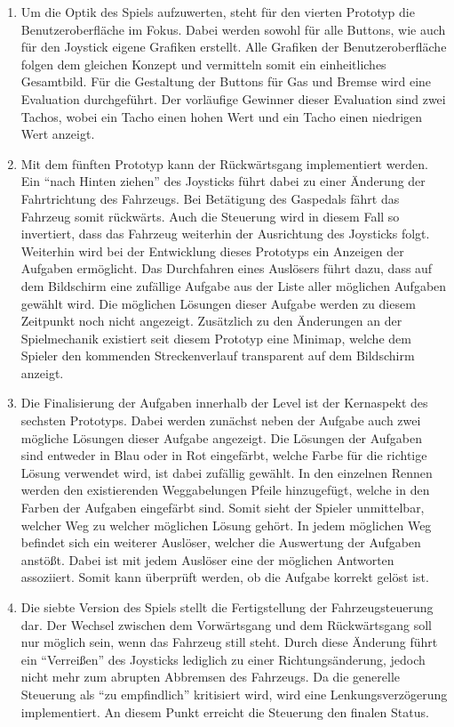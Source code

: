 \begin{enumerate}[itemindent=*,label=\textbf{Prototyp \arabic*}]
		\item{ Um die Optik des Spiels aufzuwerten, steht für den vierten Prototyp die Benutzeroberfläche im Fokus. Dabei werden sowohl für alle Buttons, wie auch für den Joystick eigene Grafiken erstellt. Alle Grafiken der Benutzeroberfläche folgen dem gleichen Konzept und vermitteln somit ein einheitliches Gesamtbild. Für die Gestaltung der Buttons für Gas und Bremse wird eine Evaluation durchgeführt. Der vorläufige Gewinner dieser Evaluation sind zwei Tachos, wobei ein Tacho einen hohen Wert und ein Tacho einen niedrigen Wert anzeigt. }
		\item{ Mit dem fünften Prototyp kann der Rückwärtsgang implementiert werden. Ein \enquote{nach Hinten ziehen} des Joysticks führt dabei zu einer Änderung der Fahrtrichtung des Fahrzeugs. Bei Betätigung des Gaspedals fährt das Fahrzeug somit rückwärts. Auch die Steuerung wird in diesem Fall so invertiert, dass das Fahrzeug weiterhin der Ausrichtung des Joysticks folgt. Weiterhin wird bei der Entwicklung dieses Prototyps ein Anzeigen der Aufgaben ermöglicht. Das Durchfahren eines Auslösers führt dazu, dass auf dem Bildschirm eine zufällige Aufgabe aus der Liste aller möglichen Aufgaben gewählt wird. Die möglichen Lösungen dieser Aufgabe werden zu diesem Zeitpunkt noch nicht angezeigt. Zusätzlich zu den Änderungen an der Spielmechanik existiert seit diesem Prototyp eine Minimap, welche dem Spieler den kommenden Streckenverlauf transparent auf dem Bildschirm anzeigt. }
		\item{ Die Finalisierung der Aufgaben innerhalb der Level ist der Kernaspekt des sechsten Prototyps. Dabei werden zunächst neben der Aufgabe auch zwei mögliche Lösungen dieser Aufgabe angezeigt. Die Lösungen der Aufgaben sind entweder in Blau oder in Rot eingefärbt, welche Farbe für die richtige Lösung verwendet wird, ist dabei zufällig gewählt. In den einzelnen Rennen werden den existierenden Weggabelungen Pfeile hinzugefügt, welche in den Farben der Aufgaben eingefärbt sind. Somit sieht der Spieler unmittelbar, welcher Weg zu welcher möglichen Lösung gehört. In jedem möglichen Weg befindet sich ein weiterer Auslöser, welcher die Auswertung der Aufgaben anstößt. Dabei ist mit jedem Auslöser eine der möglichen Antworten assoziiert. Somit kann überprüft werden, ob die Aufgabe korrekt gelöst ist. }
		\item{ Die siebte Version des Spiels stellt die Fertigstellung der Fahrzeugsteuerung dar. Der Wechsel zwischen dem Vorwärtsgang und dem Rückwärtsgang soll nur möglich sein, wenn das Fahrzeug still steht. Durch diese Änderung führt ein \enquote{Verreißen} des Joysticks lediglich zu einer Richtungsänderung, jedoch nicht mehr zum abrupten Abbremsen des Fahrzeugs. Da die generelle Steuerung als \enquote{zu empfindlich} kritisiert wird, wird eine Lenkungsverzögerung implementiert. An diesem Punkt erreicht die Steuerung den finalen Status.}

\end{enumerate}
